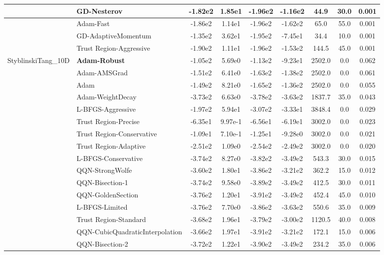 \documentclass[10pt]{article}
\begin{document}
\begin{longtable}{|l|l|c|c|c|c|c|c|c|}
\hline
 & GD-Nesterov & -1.82e2 & 1.85e1 & -1.96e2 & -1.16e2 & 44.9 & 30.0 & 0.001 \\
\hline
 & Adam-Fast & -1.86e2 & 1.14e1 & -1.96e2 & -1.62e2 & 65.0 & 55.0 & 0.001 \\
\hline
 & GD-AdaptiveMomentum & -1.35e2 & 3.62e1 & -1.95e2 & -7.45e1 & 34.4 & 10.0 & 0.001 \\
\hline
 & Trust Region-Aggressive & -1.90e2 & 1.11e1 & -1.96e2 & -1.53e2 & 144.5 & 45.0 & 0.001 \\
StyblinskiTang\_10D & \textbf{Adam-Robust} & -1.05e2 & 5.69e0 & -1.13e2 & -9.23e1 & 2502.0 & 0.0 & 0.062 \\
\hline
 & Adam-AMSGrad & -1.51e2 & 6.41e0 & -1.63e2 & -1.38e2 & 2502.0 & 0.0 & 0.061 \\
\hline
 & Adam & -1.49e2 & 8.21e0 & -1.65e2 & -1.36e2 & 2502.0 & 0.0 & 0.055 \\
\hline
 & Adam-WeightDecay & -3.73e2 & 6.63e0 & -3.78e2 & -3.63e2 & 1837.7 & 35.0 & 0.043 \\
\hline
 & L-BFGS-Aggressive & -1.97e2 & 5.94e1 & -3.07e2 & -3.33e1 & 3848.4 & 0.0 & 0.029 \\
\hline
 & Trust Region-Precise & -6.35e1 & 9.97e-1 & -6.56e1 & -6.19e1 & 3002.0 & 0.0 & 0.023 \\
\hline
 & Trust Region-Conservative & -1.09e1 & 7.10e-1 & -1.25e1 & -9.28e0 & 3002.0 & 0.0 & 0.021 \\
\hline
 & Trust Region-Adaptive & -2.51e2 & 1.09e0 & -2.54e2 & -2.49e2 & 3002.0 & 0.0 & 0.020 \\
\hline
 & L-BFGS-Conservative & -3.74e2 & 8.27e0 & -3.82e2 & -3.49e2 & 543.3 & 30.0 & 0.015 \\
\hline
 & QQN-StrongWolfe & -3.60e2 & 1.80e1 & -3.86e2 & -3.21e2 & 362.2 & 15.0 & 0.012 \\
\hline
 & QQN-Bisection-1 & -3.74e2 & 9.58e0 & -3.89e2 & -3.49e2 & 412.5 & 30.0 & 0.011 \\
\hline
 & QQN-GoldenSection & -3.76e2 & 1.20e1 & -3.91e2 & -3.49e2 & 452.4 & 45.0 & 0.010 \\
\hline
 & L-BFGS-Limited & -3.76e2 & 7.70e0 & -3.86e2 & -3.63e2 & 550.6 & 35.0 & 0.009 \\
\hline
 & Trust Region-Standard & -3.68e2 & 1.96e1 & -3.79e2 & -3.00e2 & 1120.5 & 40.0 & 0.008 \\
\hline
 & QQN-CubicQuadraticInterpolation & -3.66e2 & 1.97e1 & -3.91e2 & -3.21e2 & 172.1 & 15.0 & 0.006 \\
\hline
 & QQN-Bisection-2 & -3.72e2 & 1.22e1 & -3.90e2 & -3.49e2 & 234.2 & 35.0 & 0.006 \\

\end{longtable}
\end{document}
